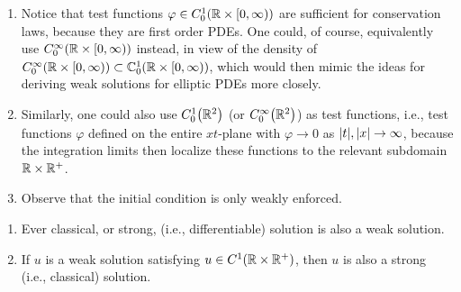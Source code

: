 \begin{remark}
	\begin{enumerate}
		\item Notice that test functions \(\varphi \in C_0^1\parentheses*{\R \times \left[0, \infty\right)}\) are sufficient for conservation laws, because they are first order PDEs.
		One could, of course, equivalently use \(C_0^\infty\parentheses*{\R \times \left[0, \infty\right)}\) instead, in view of the density of \(C_0^\infty\parentheses*{\R \times \left[0, \infty\right)} \subset \C_0^1\parentheses*{\R \times \left[0, \infty\right)}\), which would then mimic the ideas for deriving weak solutions for elliptic PDEs more closely.
		\item Similarly, one could also use \(C_0^1\parentheses*{\R^2}\) (or \(C_0^\infty\parentheses*{\R^2}\)) as test functions, i.e., test functions \(\varphi\) defined on the entire \(xt\)-plane with \(\varphi \to 0\) as \(\absolute*{t}, \absolute*{x} \to \infty\), because the integration limits then localize these functions to the relevant subdomain \(\mathbb{R} \times \mathbb{R}^+\).
		\item Observe that the initial condition is only weakly enforced.
	\end{enumerate}
\end{remark}

\begin{theorem}
	\begin{enumerate}
		\item Ever classical, or strong, (i.e., differentiable) solution is also a weak solution.
		\item If \(u\) is a weak solution satisfying \(u \in C^1\parentheses*{\R \times \R^+}\), then \(u\) is also a strong (i.e., classical) solution.
	\end{enumerate}
\end{theorem}

